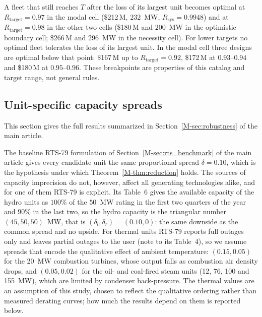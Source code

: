 \documentclass[11pt]{article}
\newcommand{\Rsys}{R_{\mathrm{sys}}}\newcommand{\Rtarget}{R_{\mathrm{target}}}
\begin{document}
A fleet that still reaches $T$ after the loss of its largest unit becomes optimal at $\Rtarget = 0.97$
in the modal cell (\$212\,M, $232$~MW, $\Rsys = 0.9948$) and at $\Rtarget = 0.98$ in the other two
cells (\$180\,M and $200$~MW in the optimistic boundary cell; \$266\,M and $296$~MW in the necessity cell).
For lower targets no optimal fleet tolerates the loss of its largest unit. In the modal cell three designs are
optimal below that point: \$167\,M up to $\Rtarget = 0.92$, \$172\,M at
$0.93$--$0.94$ and \$180\,M at $0.95$--$0.96$. These breakpoints are properties of this catalog and target
range, not general rules.


\subsection{Unit-specific capacity spreads} \label{sec:supp_rts_unit}
This section gives the full results summarized in Section~\ref*{M-sec:robustness} of the main article.


The baseline RTS-79 formulation of Section~\ref*{M-sec:rts_benchmark} of the main article gives every candidate unit the same proportional spread $\delta = 0.10$, which is the hypothesis under which Theorem~\ref*{M-thm:reduction} holds. The sources of capacity imprecision do not, however, affect all generating technologies alike, and for one of them RTS-79 is explicit. Its Table~6 gives the available capacity of the hydro units as $100\%$ of the $50$~MW rating in the first two quarters of the year and $90\%$ in the last two, so the hydro capacity is the triangular number $(45, 50, 50)$~MW, that is $(\delta_l,\delta_r) = (0.10, 0)$: the same downside as the common spread and no upside. For thermal units RTS-79 reports full outages only and leaves partial outages to the user (note to its Table~4), so we assume spreads that encode the qualitative effect of ambient temperature: $(0.15, 0.05)$ for the 20~MW combustion turbines, whose output falls as combustion air density drops, and $(0.05, 0.02)$ for the oil- and coal-fired steam units (12, 76, 100 and 155~MW), which are limited by condenser back-pressure. The thermal values are an assumption of this study, chosen to reflect the qualitative ordering rather than measured derating curves; how much the results depend on them is reported below.
\end{document}
